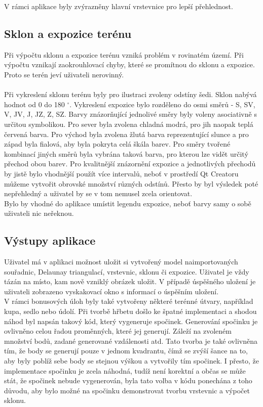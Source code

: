 \documentclass[a4paper, 12pt]{article}
\begin{document}
V rámci aplikace byly zvýrazněny hlavní vrstevnice pro lepší přehlednost. 

\subsection{Sklon a expozice terénu}
Při výpočtu sklonu a expozice terénu vzniká problém v rovinatém území. Při výpočtu vznikají zaokrouhlovací chyby, které se promítnou do sklonu a expozice. Proto se terén jeví uživateli nerovinný.\\
\\
Při vykreslení sklonu terénu byly pro ilustraci zvoleny odstíny šedi. Sklon nabývá hodnot od 0 do 180 $^\circ$. Vykreslení expozice bylo rozděleno do osmi směrů - S, SV, V, JV, J, JZ, Z, SZ. Barvy znázorňující jednolivé směry byly voleny asociativně s určitou symbolikou. Pro sever byla zvolena chladná modrá, pro jih naopak teplá červená barva. Pro východ byla zvolena žlutá barva reprezentující slunce a pro západ byla fialová, aby byla pokryta celá škála barev. Pro směry tvořené kombinací jiných směrů byla vybrána taková barva, pro kterou lze vidět určitý přechod obou barev. Pro kvalitnější znázornění expozice a jednotlivých přechodů by jistě bylo vhodnější použít více intervalů, neboť v prostředí Qt Creatoru můžeme vytvořit obrovské množství různých odstínů. Přesto by byl výsledek poté nepřehledný a uživatel by se v tom nemusel zcela orientovat. \\

Bylo by vhodné do aplikace umístit legendu expozice, neboť barvy samy o sobě uživateli nic neřeknou.

\subsection{Výstupy aplikace}
Uživatel má v aplikaci možnost uložit si vytvořený model naimportovaných souřadnic, Delaunay triangulací, vrstevnic, sklonu či expozice. Uživatel je vždy tázán na místo, kam nově vzniklý obrázek uložit. V případě úspěšného uložení je uživateli zobrazeno vyskakovací okno s informací o úspěšním uložení. \\

V rámci bonusových úloh byly také vytvořeny některé terénné útvary, například kupa, sedlo nebo údolí. Při tvorbě hřbetu došlo ke špatné implementaci a shodou náhod byl napsán takový kód, který vygeneruje spočinek. Generování spočinku je ovlivněno celou řadou proměnných, které jej generují. Záleží na zvoleném množství bodů, zadané generované vzdálenosti atd. Tato tvorba je také ovlivněna tím, že body se generují pouze v jednom kvadrantu, čímž se zvýší šance na to, aby byly poblíž sebe body se stejnou výškou a vytvořily tím spočinek. I přesto, že implementace spočinku je zcela náhodná, tudíž není korektní a občas se může stát, že spočinek nebude vygenerován, byla tato volba v kódu ponechána z toho důvodu, aby bylo možné na spočinku demonstrovat tvorbu vrstevnic a výpočet sklonu. \\ 
\end{document}
